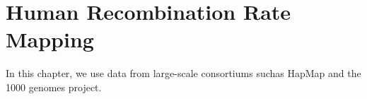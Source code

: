 
\chapter{Human Recombination Rate Mapping}
\label{ch:human_recombination_rate}

In this chapter, we use data from large-scale consortiums suchas HapMap and the 1000 genomes project.

\lipsum